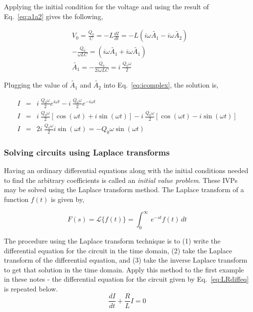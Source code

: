 \documentclass[12pt]{article}
\begin{document}
\begin{flushleft}
Applying the initial condition for the voltage and using the result of Eq.~\ref{eq:a1a2} gives the following,

\begin{equation*}
\begin{aligned}
& V_{0}=\frac{Q_{0}}{C}=-L\frac{dI}{dt}=-L\left( i\omega\tilde{A_{1}} - i\omega\tilde{A_{2}} \right) \\
& -\frac{Q_{0}}{\omega LC}=\left( i\omega\tilde{A_{1}} + i\omega\tilde{A_{1}} \right) \\
& \tilde{A_{1}} =  -\frac{Q_{0}}{2i\omega LC} = i\ \frac{Q_{0}\omega}{2}
\end{aligned} 
\end{equation*}

Plugging the value of $\tilde{A_{1}}$ and $\tilde{A_{2}}$ into Eq.~\ref{eq:icomplex}, the solution is,

\begin{eqnarray}
I & = & i\ \frac{Q_{0}\omega}{2}e^{i\omega t} -  i\ \frac{Q_{0}\omega}{2}e^{-i\omega t} \nonumber \\
I & = & i\ \frac{Q_{0}\omega}{2}\left[ \cos{(\omega t)} +i\sin{(\omega t)} \right] - i\ \frac{Q_{0}\omega}{2}\left[ \cos{(\omega t)} -i\sin{(\omega t)} \right] \nonumber \\
I & = & 2 i\ \frac{Q_{0}\omega}{2} i \sin{(\omega t)} = -Q_{0}\omega \sin{(\omega t)} 
\label{eq:compsol}
\end{eqnarray}


\iffalse
\vspace{.2in}
\subsubsection*{Solving circuits using Laplace transforms}

Having an ordinary differential equations along with the initial conditions needed to find the arbitrary coefficients is called an {\it initial value problem}.  These IVPs may be solved using the Laplace transform method.  The Laplace transform of a function $f(t)$ is given by,

\[
F(s) =\mathcal{L} \{ f(t) \} =\int_{0}^{\infty} \, e^{-st}f(t)\, dt
\]

The procedure using the Laplace transform technique is to (1) write the differential equation for the circuit in the time domain, (2) take the Laplace transform of the differential equation, and (3) take the inverse Laplace transform to get that solution in the time domain.  Apply this method to the first example in these notes - the differential equation for the circuit given by Eq.~\ref{eq:LRdiffeq} is repeated below.
\[
\frac{dI}{dt} +\frac{R}{L}I = 0
\]


\end{flushleft}
\end{document}
